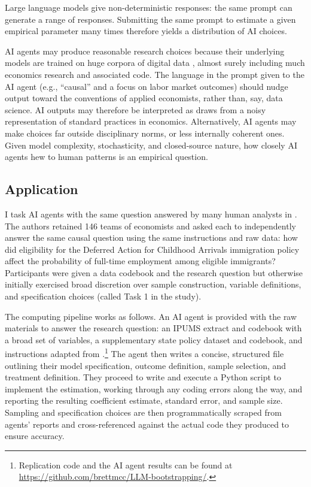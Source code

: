 \documentclass[
  12pt]{article}
\begin{document}
Large language models give non-deterministic responses: the same prompt
can generate a range of responses. Submitting the same prompt to
estimate a given empirical parameter many times therefore yields a
distribution of AI choices.

AI agents may produce reasonable research choices because their
underlying models are trained on huge corpora of digital data
\citep{openai2025gpt5systemcard, anthropic2026systemcard}, almost surely
including much economics research and associated code. The language in
the prompt given to the AI agent (e.g., ``causal'' and a focus on labor
market outcomes) should nudge output toward the conventions of applied
economists, rather than, say, data science. AI outputs may therefore be
interpreted as draws from a noisy representation of standard practices
in economics. Alternatively, AI agents may make choices far outside
disciplinary norms, or less internally coherent ones. Given model
complexity, stochasticity, and closed-source nature, how closely AI
agents hew to human patterns is an empirical question.

\subsection{Application}\label{application}

I task AI agents with the same question answered by many human analysts
in \citet{huntingtonklein2025sources}. The authors retained 146 teams of
economists and asked each to independently answer the same causal
question using the same instructions and raw data: how did eligibility
for the Deferred Action for Childhood Arrivals immigration policy affect
the probability of full-time employment among eligible immigrants?
Participants were given a data codebook and the research question but
otherwise initially exercised broad discretion over sample construction,
variable definitions, and specification choices (called Task 1 in the
study).

The computing pipeline works as follows. An AI agent is provided with
the raw materials to answer the research question: an IPUMS extract and
codebook with a broad set of variables, a supplementary state policy
dataset and codebook, and instructions adapted from
\citet{huntingtonklein2025sources}.\footnote{Replication code and the AI
  agent results can be found at
  \url{https://github.com/brettmcc/LLM-bootstrapping/}.} The agent then
writes a concise, structured file outlining their model specification,
outcome definition, sample selection, and treatment definition. They
proceed to write and execute a Python script to implement the
estimation, working through any coding errors along the way, and
reporting the resulting coefficient estimate, standard error, and sample
size. Sampling and specification choices are then programmatically
scraped from agents' reports and cross-referenced against the actual
code they produced to ensure accuracy.
\end{document}
